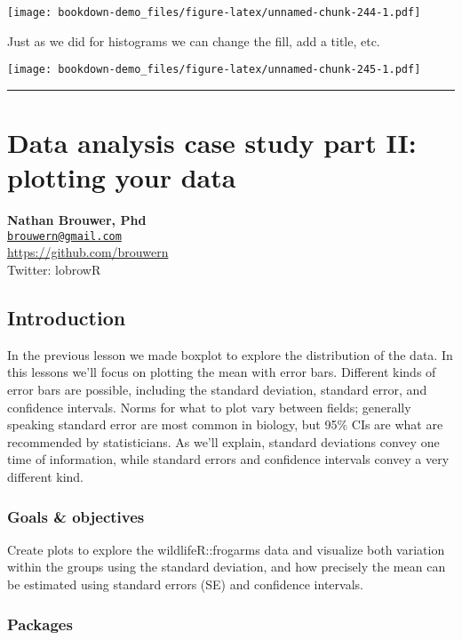 \documentclass[]{book}
\theoremstyle{definition}
\theoremstyle{definition}
\theoremstyle{definition}
\theoremstyle{remark}
\begin{document}
\texttt{[image: bookdown-demo\_files/figure-latex/unnamed-chunk-244-1.pdf]}

Just as we did for histograms we can change the fill, add a title, etc.

\texttt{[image: bookdown-demo\_files/figure-latex/unnamed-chunk-245-1.pdf]}

\begin{center}\rule{0.5\linewidth}{\linethickness}\end{center}

\chapter{Data analysis case study part II: plotting your
data}\label{data-analysis-case-study-part-ii-plotting-your-data}

\textbf{Nathan Brouwer, Phd}\\
\href{mailto:brouwern@gmail.com}{\nolinkurl{brouwern@gmail.com}}\\
\url{https://github.com/brouwern}\\
Twitter: lobrowR

\section{Introduction}\label{introduction-10}

In the previous lesson we made boxplot to explore the distribution of
the data. In this lessons we'll focus on plotting the mean with error
bars. Different kinds of error bars are possible, including the standard
deviation, standard error, and confidence intervals. Norms for what to
plot vary between fields; generally speaking standard error are most
common in biology, but 95\% CIs are what are recommended by
statisticians. As we'll explain, standard deviations convey one time of
information, while standard errors and confidence intervals convey a
very different kind.

\subsection{Goals \& objectives}\label{goals-objectives-1}

Create plots to explore the wildlifeR::frogarms data and visualize both
variation within the groups using the standard deviation, and how
precisely the mean can be estimated using standard errors (SE) and
confidence intervals.

\subsection{Packages}\label{packages-9}
\end{document}

